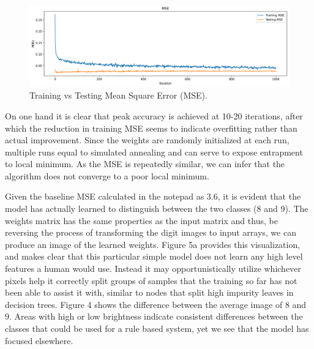 \documentclass{article}
\begin{document}
\begin{figure}[h!]
    \centering
    \includegraphics[width=\textwidth]{./plots/plot5.png}
    \caption{Training vs Testing Mean Square Error (MSE).}
    \label{fig:plot4}
\end{figure}

On one hand it is clear that peak accuracy is achieved at 10-20 iterations, after which the reduction in training MSE seems to indicate overfitting rather than actual improvement.
Since the weights are randomly initialized at each run, multiple runs equal to simulated annealing and can serve to expose entrapment to local minimum.
As the MSE is repeatedly similar, we can infer that the algorithm does not converge to a poor local minimum.

Given the baseline MSE calculated in the notepad as 3.6, it is evident that the model has actually learned to distinguish between the two classes (8 and 9).
The weights matrix has the same properties as the input matrix and thus, be reversing the process of transforming the digit images to input arrays, we can produce an image of the learned weights.
Figure 5a provides this visualization, and makes clear that this particular simple model does not learn any high level features a human would use.
Instead it may opportunistically utilize whichever pixels help it correctly split groups of samples that the training so far has not been able to assist it with, similar to nodes that split high impurity leaves in decision trees.
Figure 4 shows the difference between the average image of 8 and 9.
Areas with high or low brightness indicate consistent differences between the classes that could be used for a rule based system, yet we see that the model has focused elsewhere.
\end{document}
